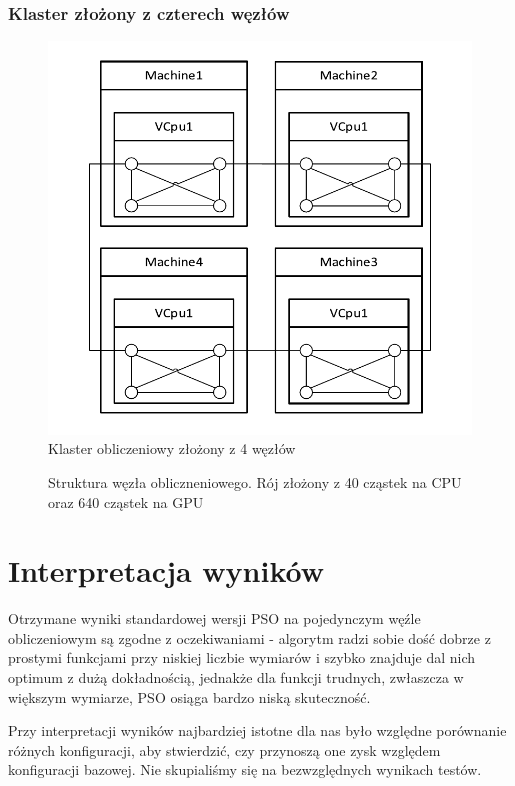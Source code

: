 \documentclass[12pt, twoside, openany, abstract=on]{report}
\theoremstyle{definition}
\begin{document}
\subsubsection{Klaster złożony z czterech węzłów}
\begin{figure}[H]
    \centering
    \includegraphics[scale=1]{klasterBbobNoGPU4Nodes.pdf} 
 \caption{Klaster obliczeniowy złożony z 4 węzłów}
\end{figure}

\begin{figure}[H]
    \centering
 \caption{Struktura węzła obliczneniowego. Rój złożony z 40 cząstek na CPU oraz 640 cząstek na GPU}
\end{figure}

\section{Interpretacja wyników}
Otrzymane wyniki standardowej wersji PSO na pojedynczym węźle obliczeniowym są zgodne z oczekiwaniami - algorytm radzi sobie dość dobrze z prostymi funkcjami przy niskiej liczbie wymiarów i szybko znajduje dal nich optimum z dużą dokładnością, jednakże dla funkcji trudnych, zwłaszcza w większym wymiarze, PSO osiąga bardzo niską skuteczność.

Przy interpretacji wyników najbardziej istotne dla nas było względne porównanie różnych konfiguracji, aby stwierdzić, czy przynoszą one zysk względem konfiguracji bazowej. Nie skupialiśmy się na bezwzględnych wynikach testów.
\end{document}
